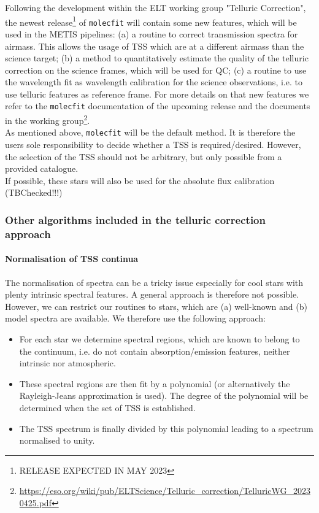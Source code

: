 Following the development within the \ac{ELT} working group "Telluric Correction", the newest release\footnote{\color{red}RELEASE EXPECTED IN MAY 2023\color{black}} of \texttt{molecfit} will contain some new features, which will be used in the \ac{METIS} pipelines: (a) a routine to correct transmission spectra for airmass. This allows the usage of \ac{TSS} which are at a different airmass than the science target; (b) a method to quantitatively estimate the quality of the telluric correction on the science frames, which will be used for \ac{QC}; (c) a routine to use the wavelength fit as wavelength calibration for the science observations, i.e. to use telluric features as reference frame. For more details on that new features we refer to the \texttt{molecfit} documentation of the upcoming release and the documents in the working group\footnote{\url{https://eso.org/wiki/pub/ELTScience/Telluric_correction/TelluricWG_20230425.pdf}}.\\
As mentioned above, \texttt{molecfit} will be the default method. It is therefore the users sole responsibility to decide whether a \ac{TSS} is required/desired. However, the selection of the \ac{TSS} should not be arbitrary, but only possible from a provided catalogue.\\
If possible, these stars will also be used for the absolute flux calibration \color{red}(TBChecked!!!)\color{black}

\subsubsection{Other algorithms included in the telluric correction approach}\label{ssec:otheralgstellcorr}
\paragraph{Normalisation of \ac{TSS} continua\newline}\label{ssec:spec_normalisation}
The normalisation of spectra can be a tricky issue especially for cool stars with plenty intrinsic spectral features. A general approach is therefore not possible. However, we can restrict our routines to stars, which are (a) well-known and (b) model spectra are available. We therefore use the following approach: 
\begin{itemize}
    \item For each star we determine spectral regions, which are known to belong to the continuum, i.e. do not contain absorption/emission features, neither intrinsic nor atmospheric.
    \item These spectral regions are then fit by a polynomial (or alternatively the Rayleigh-Jeans approximation is used). The degree of the polynomial will be determined when the set of \ac{TSS} is established. 
    \item The \ac{TSS} spectrum is finally divided by this polynomial leading to a spectrum normalised to unity.
\end{itemize} 

